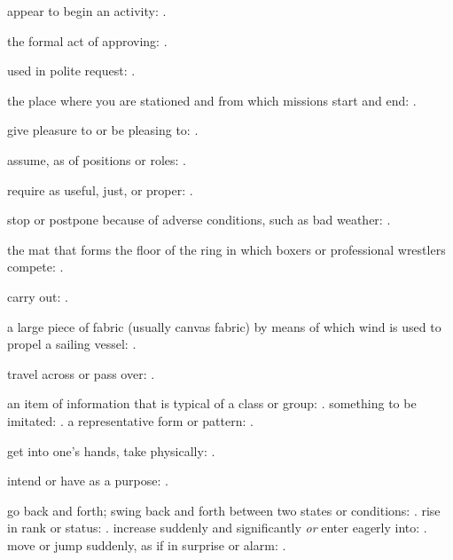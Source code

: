   appear to begin an activity: .

  the formal act of approving:   .

  used in polite request: .

  the place where you are stationed and from which missions start and end:   .

  give pleasure to or be pleasing to:   .

  assume, as of positions or roles:   .

  require as useful, just, or proper:   .

  stop or postpone because of adverse conditions, such as bad weather: .

  the mat that forms the floor of the ring in which boxers or professional wrestlers compete:   .

  carry out: .

  a large piece of fabric (usually canvas fabric) by means of which wind is used to propel a sailing vessel:   .

  travel across or pass over:   .

  an item of information that is typical of a class or group:   . something to be imitated:   . a representative form or pattern:   .

  get into one's hands, take physically:   .

  intend or have as a purpose: .

  go back and forth; swing back and forth between two states or conditions:   . rise in rank or status:   . increase suddenly and significantly \textit{or} enter eagerly into: . move or jump suddenly, as if in surprise or alarm:   .

